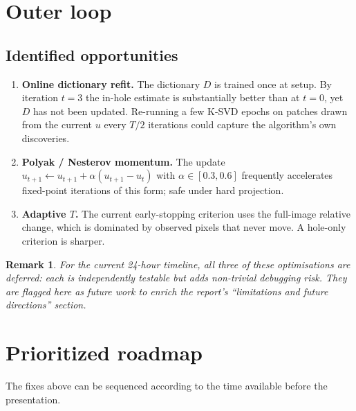 \documentclass[11pt,a4paper]{article}
\newtheorem{remark}[theorem]{Remark}
\begin{document}
\section{Outer loop}\label{sec:outer}

\subsection*{Identified opportunities}

\begin{enumerate}[leftmargin=2em]
    \item \textbf{Online dictionary refit.} The dictionary $D$ is trained
    once at setup. By iteration $t = 3$ the in-hole estimate is
    substantially better than at $t = 0$, yet $D$ has not been updated.
    Re-running a few K-SVD epochs on patches drawn from the current $u$
    every $T/2$ iterations could capture the algorithm's own discoveries.
    \item \textbf{Polyak / Nesterov momentum.} The update
    $u_{t+1} \leftarrow u_{t+1} + \alpha (u_{t+1} - u_t)$ with $\alpha
    \in [0.3, 0.6]$ frequently accelerates fixed-point iterations of this
    form; safe under hard projection.
    \item \textbf{Adaptive $T$.} The current early-stopping criterion uses
    the full-image relative change, which is dominated by observed pixels
    that never move. A hole-only criterion is sharper.
\end{enumerate}

\begin{remark}
For the current 24-hour timeline, all three of these optimisations are
deferred: each is independently testable but adds non-trivial debugging
risk. They are flagged here as future work to enrich the report's
``limitations and future directions'' section.
\end{remark}

\section{Prioritized roadmap}\label{sec:roadmap}

The fixes above can be sequenced according to the time available before
the presentation.
\end{document}
